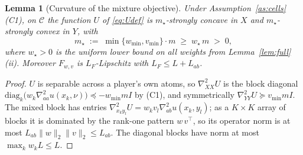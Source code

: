 \documentclass[11pt,a4paper]{article}
\theoremstyle{plain}
\newtheorem{lemma}[theorem]{Lemma}
\theoremstyle{definition}
\theoremstyle{remark}
\newcommand{\norm}[1]{\lVert #1 \rVert}
\begin{document}
\begin{lemma}[Curvature of the mixture objective]\label{lem:Ucurv}
Under Assumption~\ref{as:cells}(C1), on $\mathcal C$ the function $U$ of
\eqref{eq:Udef} is $m_\star$-strongly concave in $X$ and $m_\star$-strongly convex in
$Y$, with
\[
m_\star\;:=\;\min\{w_{\min},v_{\min}\}\cdot m\;\ge\;w_\star\,m\;>\;0,
\]
where $w_\star>0$ is the uniform lower bound on all weights from
Lemma~\ref{lem:full}(ii). Moreover $F_{w,v}$ is $L_F$-Lipschitz with $L_F\le L+L_{ab}$.
\end{lemma}
\begin{proof}
$U$ is separable across a player's own atoms, so $\nabla^2_{XX}U$ is the block diagonal
$\mathrm{diag}_k\big(w_k\nabla^2_{aa}u(x_k,\nu)\big)\preceq-w_{\min}mI$ by (C1), and
symmetrically $\nabla^2_{YY}U\succeq v_{\min}mI$. The mixed block has entries
$\nabla^2_{x_ky_l}U=w_kv_l\nabla^2_{ab}u(x_k,y_l)$; as a $K\times K$ array of blocks it
is dominated by the rank-one pattern $w\,v^\top$, so its operator norm is at most
$L_{ab}\norm{w}_2\norm{v}_2\le L_{ab}$. The diagonal blocks have norm at most
$\max_kw_kL\le L$.
\end{proof}
\end{document}

